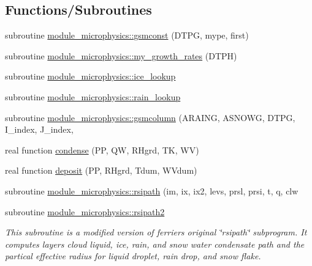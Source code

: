 \subsection*{Functions/\+Subroutines}
\begin{DoxyCompactItemize}
\item 
subroutine \hyperlink{namespacemodule__microphysics_ad5f89457c2cd2ba431b1c60d5ecbecc4}{module\+\_\+microphysics\+::gsmconst} (D\+T\+PG, mype, first)
\item 
subroutine \hyperlink{namespacemodule__microphysics_aa41d6b0b3b4eca4b41999d6c6aadb317}{module\+\_\+microphysics\+::my\+\_\+growth\+\_\+rates} (D\+T\+PH)
\item 
subroutine \hyperlink{namespacemodule__microphysics_a9273c6542f2e983e0f9040c80907b3c6}{module\+\_\+microphysics\+::ice\+\_\+lookup}
\item 
subroutine \hyperlink{namespacemodule__microphysics_a0090b42e85bd381e5459a9e8db9dc120}{module\+\_\+microphysics\+::rain\+\_\+lookup}
\item 
subroutine \hyperlink{namespacemodule__microphysics_a7a0b4005a965eda2890022b02f807bb7}{module\+\_\+microphysics\+::gsmcolumn} (A\+R\+A\+I\+NG, A\+S\+N\+O\+WG, D\+T\+PG, I\+\_\+index, J\+\_\+index,    
\item 
real function \hyperlink{zhang__orig_2module__bfmicrophysics_8f_ac3e5788798119e5db1749932012a1096}{condense} (PP, QW, R\+Hgrd, TK, WV)
\item 
real function \hyperlink{zhang__orig_2module__bfmicrophysics_8f_a3c00353fd3ab0fba51a524a05a5fc640}{deposit} (PP, R\+Hgrd, Tdum, W\+Vdum)
\item 
subroutine \hyperlink{namespacemodule__microphysics_a9cf7964ff1097213773b2b91e13d18d0}{module\+\_\+microphysics\+::rsipath} (im, ix, ix2, levs, prsl, prsi, t, q, clw          
\end{DoxyCompactItemize}
{\bf }\par
\begin{DoxyCompactItemize}
\item 
subroutine \hyperlink{group__module__radiation__clouds_ga3645dec44f2cc7e30b57d32531f74ba4}{module\+\_\+microphysics\+::rsipath2}
\begin{DoxyCompactList}\small\item\em This subroutine is a modified version of ferrier\textquotesingle{}s original \char`\"{}rsipath\char`\"{} subprogram. It computes layer\textquotesingle{}s cloud liquid, ice, rain, and snow water condensate path and the partical effective radius for liquid droplet, rain drop, and snow flake. \end{DoxyCompactList}\end{DoxyCompactItemize}



